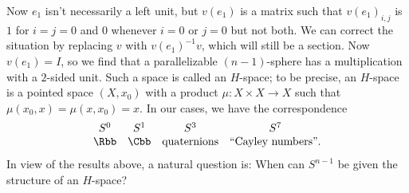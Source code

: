 Now $e_1$ isn't necessarily a left unit, but $v(e_1)$ is a matrix such that $v(e_1)_{i, j}$ is $1$ for $i = j = 0$ and $0$ whenever $i = 0$ or $j = 0$ but not both.  We can correct the situation by replacing $v$ with $v(e_1)^{-1} v$, which will still be a section. %
Now $v(e_1) = I$, so we find that a parallelizable $(n-1)$-sphere has a multiplication with a $2$-sided unit.  Such a space is called an $H$-space; to be precise, an $H$-space is a pointed space $(X, x_0)$ with a product $\mu: X \times X \to X$ such that $\mu(x_0, x) = \mu(x, x_0) = x$.  In our cases, we have the correspondence
\[
\begin{array}{cccc}
S^0 & S^1 & S^3 & S^7 \\
\Rbb & \Cbb & \hbox{quaternions} & \hbox{``Cayley numbers''}.
\end{array}\]
In view of the results above, a natural question is: When can $S^{n-1}$ be given the structure of an $H$-space?

